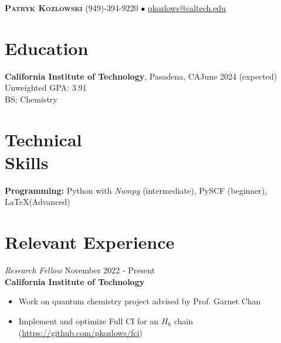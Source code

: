 \documentclass[margin,line]{resume}
\begin{document}
{\Large \textbf{\scshape Patryk Kozlowski}
\normalsize
\hspace{70mm}(949)-394-9220 $\bullet$ \url{pkozlows@caltech.edu}
}
\begin{resume}

\section{\mysidestyle Education}
\textbf{California Institute of Technology}, Pasadena, CA\hfill June 2024 (expected)\\
Unweighted GPA: 3.91\\
BS; Chemistry

\section{\mysidestyle Technical\\ Skills}
\textbf{Programming:} Python with \emph{Numpy} (intermediate), PySCF (beginner), \LaTeX  (Advanced)

\section{\mysidestyle Relevant Experience}
{\sl Research Fellow} \hfill November 2022 - Present\\
\textbf{California Institute of Technology}
\begin{itemize}
\item Work on quantum chemistry project advised by Prof. Garnet Chan
\item Implement and optimize Full CI for an $H_{6}$ chain (\url{https://github.com/pkozlows/fci})

\end{itemize}


\end{resume}
\end{document}
